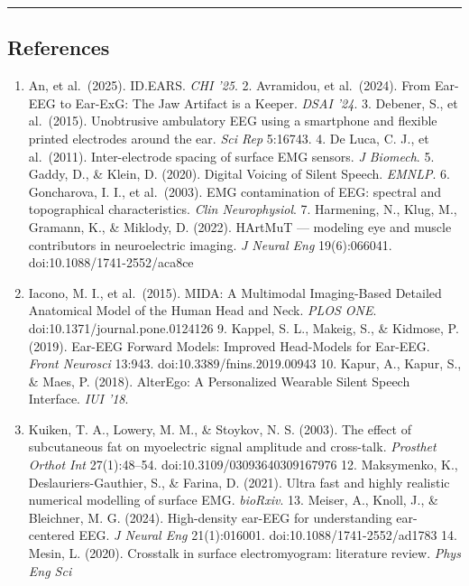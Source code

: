 \documentclass[
  11pt,
  a4paper,
]{article}
\providecommand{\tightlist}{%
  \setlength{\itemsep}{0pt}\setlength{\parskip}{0pt}}
\providecommand{\tightlist}{%
  \setlength{\itemsep}{0pt}\setlength{\parskip}{0pt}}
\begin{document}
\begin{center}\rule{0.5\linewidth}{0.5pt}\end{center}

\FloatBarrier
\subsection{References}\label{references}

\begin{enumerate}
\def\labelenumi{\arabic{enumi}.}
\tightlist
\item
  An, et al.~(2025). ID.EARS. \emph{CHI '25}. 2. Avramidou, et al.~(2024). From
  Ear-EEG to Ear-ExG: The Jaw Artifact is a Keeper. \emph{DSAI '24}. 3. Debener, S., et
  al.~(2015). Unobtrusive ambulatory EEG using a smartphone and flexible printed
  electrodes around the ear. \emph{Sci Rep} 5:16743. 4. De Luca, C. J., et al.~(2011).
  Inter-electrode spacing of surface EMG sensors. \emph{J Biomech}. 5. Gaddy, D., \&
  Klein, D. (2020). Digital Voicing of Silent Speech. \emph{EMNLP}. 6. Goncharova, I.
  I., et al.~(2003). EMG contamination of EEG: spectral and topographical
  characteristics. \emph{Clin Neurophysiol}. 7. Harmening, N., Klug, M., Gramann, K., \&
  Miklody, D. (2022). HArtMuT --- modeling eye and muscle contributors in
  neuroelectric imaging. \emph{J Neural Eng} 19(6):066041. doi:10.1088/1741-2552/aca8ce
\item
  Iacono, M. I., et al.~(2015). MIDA: A Multimodal Imaging-Based Detailed
  Anatomical Model of the Human Head and Neck. \emph{PLOS ONE}.
  doi:10.1371/journal.pone.0124126 9. Kappel, S. L., Makeig, S., \& Kidmose, P.
  (2019). Ear-EEG Forward Models: Improved Head-Models for Ear-EEG. \emph{Front
  Neurosci} 13:943. doi:10.3389/fnins.2019.00943 10. Kapur, A., Kapur, S., \& Maes,
  P. (2018). AlterEgo: A Personalized Wearable Silent Speech Interface. \emph{IUI '18}.
\item
  Kuiken, T. A., Lowery, M. M., \& Stoykov, N. S. (2003). The effect of
  subcutaneous fat on myoelectric signal amplitude and cross-talk. \emph{Prosthet
  Orthot Int} 27(1):48--54. doi:10.3109/03093640309167976 12. Maksymenko, K.,
  Deslauriers-Gauthier, S., \& Farina, D. (2021). Ultra fast and highly realistic
  numerical modelling of surface EMG. \emph{bioRxiv}. 13. Meiser, A., Knoll, J., \&
  Bleichner, M. G. (2024). High-density ear-EEG for understanding ear-centered
  EEG. \emph{J Neural Eng} 21(1):016001. doi:10.1088/1741-2552/ad1783 14. Mesin, L.
  (2020). Crosstalk in surface electromyogram: literature review. \emph{Phys Eng Sci
}
\end{enumerate}
\end{document}
